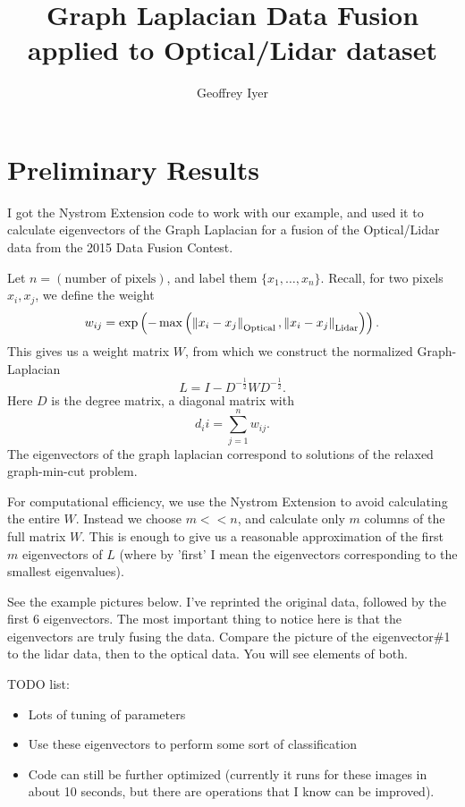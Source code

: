 
\usepackage{graphicx}



\title{Graph Laplacian Data Fusion applied to Optical/Lidar dataset}
\author{Geoffrey Iyer}
\maketitle

\section*{Preliminary Results}

I got the Nystrom Extension code to work with our example, and used it to calculate eigenvectors of the Graph Laplacian for a fusion of the Optical/Lidar data from the 2015 Data Fusion Contest.

Let $n = \left(\text{number of pixels}\right)$, and label them $\{x_1,\ldots,x_n\}$. Recall, for two pixels $x_i,x_j$, we define the weight
\[w_{ij} = \exp\left( - \max\left(\left\lVert x_i - x_j\right\rVert_{\text{Optical}}, \left\lVert x_i - x_j\right\rVert_{\text{Lidar}}\right)\right).\]
This gives us a weight matrix $W$, from which we construct the normalized Graph-Laplacian
\[L = I - D^{-\frac{1}{2}}WD^{-\frac{1}{2}}.\]
Here $D$ is the degree matrix, a diagonal matrix with
\[d_ii = \sum_{j=1}^n w_{ij}.\]
The eigenvectors of the graph laplacian correspond to solutions of the relaxed graph-min-cut problem.

For computational efficiency, we use the Nystrom Extension to avoid calculating the entire $W$. Instead we choose $m << n$, and calculate only $m$ columns of the full matrix $W$. This is enough to give us a reasonable approximation of the first $m$ eigenvectors of $L$ (where by 'first' I mean the eigenvectors corresponding to the smallest eigenvalues).

See the example pictures below. I've reprinted the original data, followed by the first 6 eigenvectors. The most important thing to notice here is that the eigenvectors are truly fusing the data. Compare the picture of the eigenvector\#1 to the lidar data, then to the optical data. You will see elements of both.

TODO list: \begin{itemize}
\item Lots of tuning of parameters
\item Use these eigenvectors to perform some sort of classification
\item Code can still be further optimized (currently it runs for these images in about 10 seconds, but there are operations that I know can be improved).
\end{itemize}

